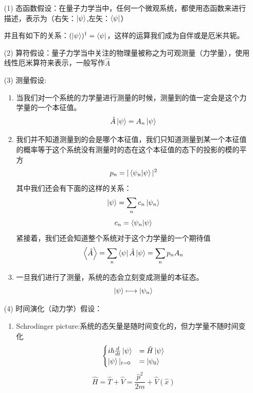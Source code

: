 \documentclass{article}
\begin{document}
\begin{enumerate}
    \item[(1)] 态函数假设：在量子力学当中，任何一个微观系统，都使用态函数来进行描述，表示为（右矢：$\ket{\psi}$,左矢：$\bra{\psi}$）

          并且有如下的关系：$\displaystyle (\ket{\psi})^\dagger =\bra{\psi}$，这样的运算我们成为自伴或是厄米共轭。
    \item[(2)] 算符假设：量子力学当中关注的物理量被称之为可观测量（力学量），使用线性厄米算符来表示，一般写作$\hat{A}$
    \item[(3)] 测量假设:
          \begin{enumerate}
              \item 当我们对一个系统的力学量进行测量的时候，测量到的值一定会是这个力学量的一个本征值。
                    \[\hat{A}\ket{\psi}=A_n\ket{\psi}\]
              \item 我们并不知道测量到的会是哪个本征值，我们只知道测量到某一个本征值的概率等于这个系统没有测量时的态在这个本征值的态下的投影的模的平方
                    \[p_n = |\innerproduct{\psi_n}{\psi}|^2\]
                    其中我们还会有下面的这样的关系：
                    \[\ket{\psi}=\sum_n c_n\ket{\psi_n}\]
                    \[c_n=\innerproduct{\psi_n}{\psi}\]
                    紧接着，我们还会知道整个系统对于这个力学量的一个期待值
                    \[\expectationvalue{\hat{A}} = \sum_n \bra{\psi}\hat{A}\ket{\psi}=\sum_np_nA_n\]
              \item 一旦我们进行了测量，系统的态会立刻变成测量的本征态。
                    \[\ket{\psi}\longmapsto \ket{\psi_n}\]
          \end{enumerate}
    \item[(4)] 时间演化（动力学）假设：
          \begin{enumerate}
              \item Schrodinger picture:系统的态矢量是随时间变化的，但力学量不随时间变化
                    \begin{equation*}
                        \begin{cases}
                            i\hbar\frac{d}{dt}\ket{\psi} & =\hat{H}\ket{\psi} \\
                            \ket{\psi}|_{t=0}            & =\ket{\psi_0}      \\
                        \end{cases}
                    \end{equation*}
                    \[\hat{H}=\hat{T}+\hat{V}=\frac{\hat{p}^2}{2m}+\hat{V}(\hat{x})\]

\end{enumerate}
\end{enumerate}
\end{document}
